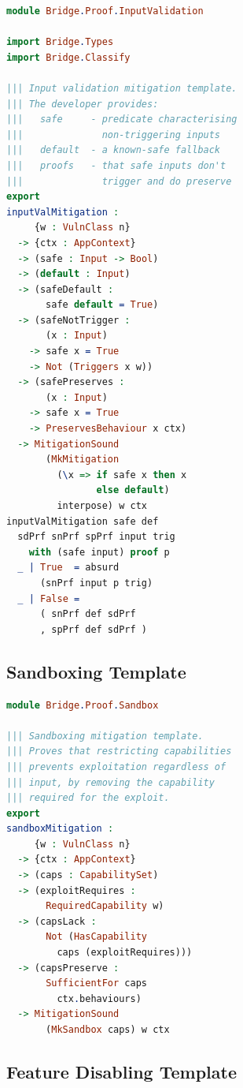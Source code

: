 \documentclass[11pt,twocolumn]{article}
\begin{document}
\begin{lstlisting}[language=Idris,caption={Complete input validation proof template},label=lst:app-input-val]
module Bridge.Proof.InputValidation

import Bridge.Types
import Bridge.Classify

||| Input validation mitigation template.
||| The developer provides:
|||   safe     - predicate characterising
|||              non-triggering inputs
|||   default  - a known-safe fallback
|||   proofs   - that safe inputs don't
|||              trigger and do preserve
export
inputValMitigation :
     {w : VulnClass n}
  -> {ctx : AppContext}
  -> (safe : Input -> Bool)
  -> (default : Input)
  -> (safeDefault :
       safe default = True)
  -> (safeNotTrigger :
       (x : Input)
    -> safe x = True
    -> Not (Triggers x w))
  -> (safePreserves :
       (x : Input)
    -> safe x = True
    -> PreservesBehaviour x ctx)
  -> MitigationSound
       (MkMitigation
         (\x => if safe x then x
                else default)
         interpose) w ctx
inputValMitigation safe def
  sdPrf snPrf spPrf input trig
    with (safe input) proof p
  _ | True  = absurd
      (snPrf input p trig)
  _ | False =
      ( snPrf def sdPrf
      , spPrf def sdPrf )
\end{lstlisting}

\subsection{Sandboxing Template}

\begin{lstlisting}[language=Idris,caption={Sandboxing proof template},label=lst:app-sandbox]
module Bridge.Proof.Sandbox

||| Sandboxing mitigation template.
||| Proves that restricting capabilities
||| prevents exploitation regardless of
||| input, by removing the capability
||| required for the exploit.
export
sandboxMitigation :
     {w : VulnClass n}
  -> {ctx : AppContext}
  -> (caps : CapabilitySet)
  -> (exploitRequires :
       RequiredCapability w)
  -> (capsLack :
       Not (HasCapability
         caps (exploitRequires)))
  -> (capsPreserve :
       SufficientFor caps
         ctx.behaviours)
  -> MitigationSound
       (MkSandbox caps) w ctx
\end{lstlisting}

\subsection{Feature Disabling Template}
\end{document}
